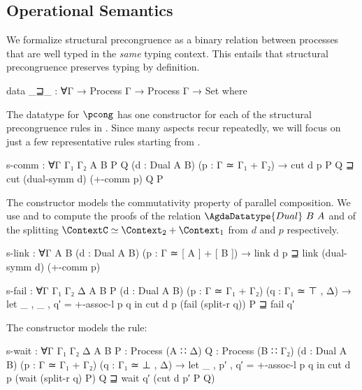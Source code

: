 \subsection{Operational Semantics}
\label{sec:semantics-agda}

We formalize structural precongruence as a binary relation between processes
that are well typed in the \emph{same} typing context. This entails that
structural precongruence preserves typing by definition.

\begin{AgdaAlign}
\begin{code}
data _⊒_ : ∀{Γ} → Process Γ → Process Γ → Set where
\end{code}

The datatype for $\pcong$ has one constructor for each of the structural
precongruence rules in . Since many aspects recur
repeatedly, we will focus on just a few representative rules starting from
\SComm.

\begin{code}
  s-comm :
    ∀{Γ Γ₁ Γ₂ A B P Q} (d : Dual A B) (p : Γ ≃ Γ₁ + Γ₂) →
    cut d p P Q ⊒ cut (dual-symm d) (+-comm p) Q P
\end{code}

The constructor  models the commutativity
property of parallel composition. We use  and
 to compute the proofs of the relation
$\AgdaDatatype{Dual}~B~A$ and of the splitting $\ContextC \simeq \Context_2 +
\Context_1$ from $d$ and $p$ respectively.

\begin{code}[hide]
  s-link :
    ∀{Γ A B}
    (d : Dual A B) (p : Γ ≃ [ A ] + [ B ]) →
    link d p ⊒ link (dual-symm d) (+-comm p)

  s-fail :
    ∀{Γ Γ₁ Γ₂ Δ A B P} (d : Dual A B)
    (p : Γ ≃ Γ₁ + Γ₂) (q : Γ₁ ≃ ⊤ , Δ) →
    let _ , _ , q′ = +-assoc-l p q in
    cut d p (fail (split-r q)) P ⊒ fail q′
\end{code}

The constructor  models the \SWait rule:

\begin{code}
  s-wait :
    ∀{Γ Γ₁ Γ₂ Δ A B} {P : Process (A ∷ Δ)} {Q : Process (B ∷ Γ₂)}
    (d : Dual A B) (p : Γ ≃ Γ₁ + Γ₂) (q : Γ₁ ≃ ⊥ , Δ) →
    let _ , p′ , q′ = +-assoc-l p q in
    cut d p (wait (split-r q) P) Q ⊒ wait q′ (cut d p′ P Q)
\end{code}


\end{AgdaAlign}
